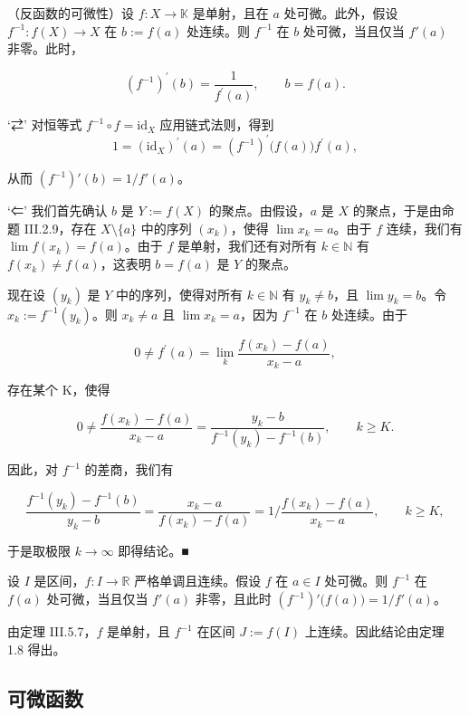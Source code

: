 \begin{theorem}

（反函数的可微性）设 $f: X \to \mathbb{K}$ 是单射，且在 $a$ 处可微。此外，假设 $f^{-1}: f(X) \to X$ 在 $b := f(a)$ 处连续。则 $f^{-1}$ 在 $b$ 处可微，当且仅当 $f'(a)$ 非零。此时，

\[
(f^{-1})^{\prime}(b)=\frac{1}{f^{\prime}(a)},\qquad b=f(a).
\]

\proofhead
‘⇄’ 对恒等式 $ f^{-1} \circ f = \mathrm{id}_X $ 应用链式法则，得到
\[
1=\left(\mathrm{i d}_{X}\right)^{\prime}(a)=\left(f^{-1}\right)^{\prime}\big(f(a)\big)f^{\prime}(a),
\]

从而 $ (f^{-1})'(b) = 1/f'(a) $。

‘⇐’ 我们首先确认 $b$ 是 $Y := f(X)$ 的聚点。由假设，$a$ 是 $X$ 的聚点，于是由命题 III.2.9，存在 $X \setminus \{a\}$ 中的序列 $(x_k)$，使得 $\lim x_k = a$。由于 $f$ 连续，我们有 $\lim f(x_k) = f(a)$。由于 $f$ 是单射，我们还有对所有 $k \in \mathbb{N}$ 有 $f(x_k) \neq f(a)$，这表明 $b = f(a)$ 是 $Y$ 的聚点。

现在设 $(y_k)$ 是 $Y$ 中的序列，使得对所有 $k \in \mathbb{N}$ 有 $y_k \neq b$，且 $\lim y_k = b$。令 $x_k := f^{-1}(y_k)$。则 $x_k \neq a$ 且 $\lim x_k = a$，因为 $f^{-1}$ 在 $b$ 处连续。由于

\[
0\neq f^{\prime}(a)=\lim_{k}\frac{f(x_{k})-f(a)}{x_{k}-a},
\]

存在某个 K，使得

\[
0\neq\frac{f(x_{k})-f(a)}{x_{k}-a}=\frac{y_{k}-b}{f^{-1}(y_{k})-f^{-1}(b)},\qquad k\geq K.
\]

因此，对 $ f^{-1} $ 的差商，我们有

\[
\frac{f^{-1}(y_{k})-f^{-1}(b)}{y_{k}-b}=\frac{x_{k}-a}{f(x_{k})-f(a)}=1\Big/\frac{f(x_{k})-f(a)}{x_{k}-a},\qquad k\geq K,
\]

于是取极限 $ k \to \infty $ 即得结论。■

\end{theorem}

\begin{corollary}

设 $ I $ 是区间，$ f: I \to \mathbb{R} $ 严格单调且连续。假设 $ f $ 在 $ a \in I $ 处可微。则 $ f^{-1} $ 在 $ f(a) $ 处可微，当且仅当 $ f'(a) $ 非零，且此时 $ (f^{-1})' \big(f(a)\big) = 1/f'(a) $。

\proofhead
由定理 III.5.7，$f$ 是单射，且 $f^{-1}$ 在区间 $J:=f(I)$ 上连续。因此结论由定理 1.8 得出。
\end{corollary}

\subsection*{可微函数}

